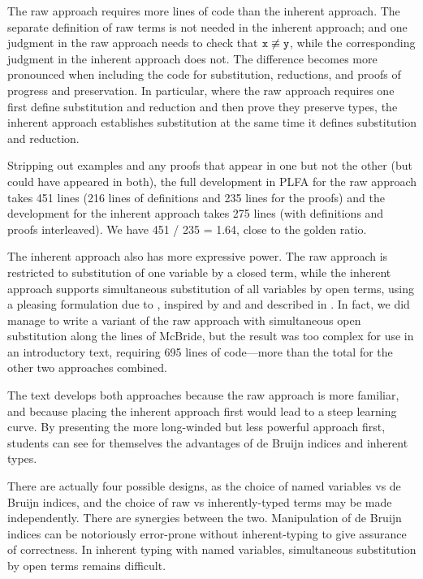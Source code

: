 \documentclass[preprint,authoryear]{elsarticle}
\begin{document}
The raw approach requires more lines of code than the inherent approach.  The
separate definition of raw terms is not needed in the inherent approach; and one
judgment in the raw approach needs to check that $\texttt{x} \not\equiv \texttt{y}$, while
the corresponding judgment in the inherent approach does not.  The difference
becomes more pronounced when including the code for substitution, reductions,
and proofs of progress and preservation.  In particular, where the raw approach
requires one first define substitution and reduction and then prove they
preserve types, the inherent approach establishes substitution at the same time
it defines substitution and reduction.

Stripping out examples and any proofs that appear in one but not the other (but
could have appeared in both), the full development in PLFA for the raw approach
takes 451 lines (216 lines of definitions and 235 lines for the proofs) and the
development for the inherent approach takes 275 lines (with definitions and
proofs interleaved).  We have 451 / 235 = 1.64, close to the golden ratio.

The inherent approach also has more expressive power.  The raw
approach is restricted to substitution of one variable by a closed
term, while the inherent approach supports simultaneous substitution
of all variables by open terms, using a pleasing formulation due to
\citet{McBride-2005}, inspired by \citet{Goguen-and-McKinna-1997} and
\citet{Altenkirch-and-Reus-1999} and described in
\citet{Allais-et-al-2017}. In fact, we did manage to write a variant of
the raw approach with simultaneous open substitution along the lines
of McBride, but the result was too complex for use in an introductory
text, requiring 695 lines of code---more than the total for the other
two approaches combined.

The text develops both approaches because the raw approach is more
familiar, and because placing the inherent approach first would
lead to a steep learning curve.  By presenting the more long-winded
but less powerful approach first, students can see for themselves the
advantages of de Bruijn indices and inherent types.

There are actually four possible designs, as the choice of named
variables vs de Bruijn indices, and the choice of raw vs
inherently-typed terms may be made independently.  There are synergies
between the two.  Manipulation of de Bruijn indices can be notoriously
error-prone without inherent-typing to give assurance of correctness.
In inherent typing with named variables, simultaneous substitution by
open terms remains difficult.
\end{document}
